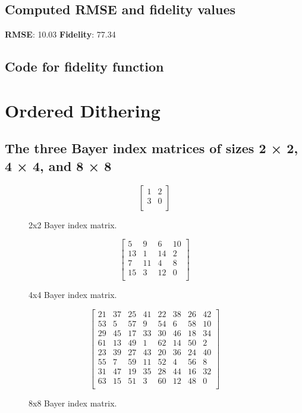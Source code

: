 \documentclass{article}
\begin{document}
\subsection{Computed RMSE and fidelity values}
\textbf{RMSE}: 10.03
\textbf{Fidelity}: 77.34
\subsection{Code for fidelity function}


\section{Ordered Dithering}
\subsection{The three Bayer index matrices of sizes 2 × 2, 4 × 4, and 8 × 8}
\begin{figure}[H]
    \begin{equation*}
        \begin{bmatrix}
        1 & 2\\
        3 & 0\\
        \end{bmatrix}
    \end{equation*}
\caption{2x2 Bayer index matrix.}
\end{figure}
\begin{figure}[H]
    \begin{equation*}
        \begin{bmatrix}
        5 & 9 & 6 & 10\\
        13 & 1 & 14 & 2\\
        7 & 11 & 4 & 8\\
        15 & 3 & 12 & 0\\
        \end{bmatrix}
    \end{equation*}
\caption{4x4 Bayer index matrix.}
\end{figure}
\begin{figure}[H]
    \begin{equation*}
        \begin{bmatrix}
        21 & 37 & 25 & 41 & 22 & 38 & 26 & 42\\
        53 & 5 & 57 & 9 & 54 & 6 & 58 & 10\\
        29 & 45 & 17 & 33 & 30 & 46 & 18 & 34\\
        61 & 13 & 49 & 1 & 62 & 14 & 50 & 2\\
        23 & 39 & 27 & 43 & 20 & 36 & 24 & 40\\
        55 & 7 & 59 & 11 & 52 & 4 & 56 & 8\\
        31 & 47 & 19 & 35 & 28 & 44 & 16 & 32\\
        63 & 15 & 51 & 3 & 60 & 12 & 48 & 0\\
        \end{bmatrix}
    \end{equation*}
\caption{8x8 Bayer index matrix.}
\end{figure}
\end{document}
